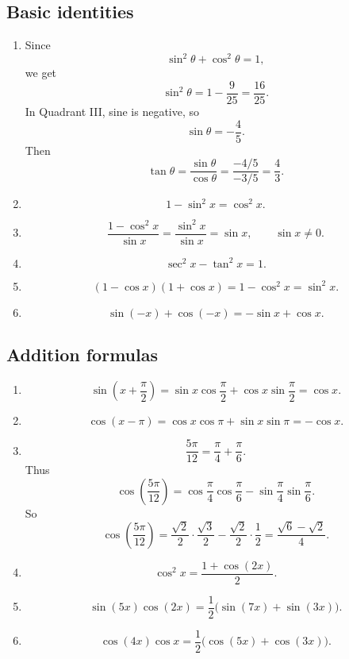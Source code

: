 \subsection*{Basic identities}

\begin{enumerate}
\item
Since
\[
\sin^2\theta+\cos^2\theta=1,
\]
we get
\[
\sin^2\theta=1-\frac{9}{25}=\frac{16}{25}.
\]
In Quadrant III, sine is negative, so
\[
\sin\theta=-\frac45.
\]
Then
\[
\tan\theta=\frac{\sin\theta}{\cos\theta}
=
\frac{-4/5}{-3/5}
=
\frac43.
\]

\item
\[
1-\sin^2 x=\cos^2 x.
\]

\item
\[
\frac{1-\cos^2 x}{\sin x}
=
\frac{\sin^2 x}{\sin x}
=
\sin x,
\qquad \sin x\neq0.
\]

\item
\[
\sec^2 x-\tan^2 x=1.
\]

\item
\[
(1-\cos x)(1+\cos x)=1-\cos^2 x=\sin^2 x.
\]

\item
\[
\sin(-x)+\cos(-x)=-\sin x+\cos x.
\]
\end{enumerate}

\subsection*{Addition formulas}

\begin{enumerate}
\item
\[
\sin\left(x+\frac{\pi}{2}\right)
=
\sin x\cos\frac{\pi}{2}
+
\cos x\sin\frac{\pi}{2}
=
\cos x.
\]

\item
\[
\cos(x-\pi)
=
\cos x\cos\pi+\sin x\sin\pi
=
-\cos x.
\]

\item
\[
\frac{5\pi}{12}=\frac{\pi}{4}+\frac{\pi}{6}.
\]
Thus
\[
\cos\left(\frac{5\pi}{12}\right)
=
\cos\frac{\pi}{4}\cos\frac{\pi}{6}
-
\sin\frac{\pi}{4}\sin\frac{\pi}{6}.
\]
So
\[
\cos\left(\frac{5\pi}{12}\right)
=
\frac{\sqrt2}{2}\cdot\frac{\sqrt3}{2}
-
\frac{\sqrt2}{2}\cdot\frac12
=
\frac{\sqrt6-\sqrt2}{4}.
\]

\item
\[
\cos^2 x=\frac{1+\cos(2x)}{2}.
\]

\item
\[
\sin(5x)\cos(2x)
=
\frac12\bigl(\sin(7x)+\sin(3x)\bigr).
\]

\item
\[
\cos(4x)\cos x
=
\frac12\bigl(\cos(5x)+\cos(3x)\bigr).
\]
\end{enumerate}

